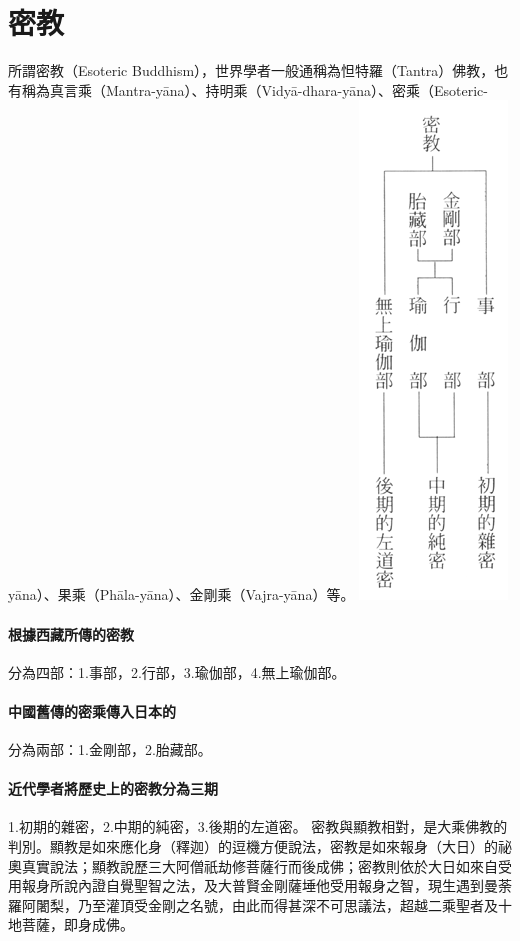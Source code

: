 \section{密教}
所謂密教（Esoteric Buddhism），世界學者一般通稱為怛特羅（Tantra）佛教，也有稱為真言乘（Mantra-yāna）、持明乘（Vidyā-dhara-yāna）、密乘（Esoteric-yāna）、果乘（Phāla-yāna）、金剛乘（Vajra-yāna）等。
\includegraphics[scale=0.3]{释家/images/密教.png}
\paragraph{根據西藏所傳的密教} 分為四部：1.事部，2.行部，3.瑜伽部，4.無上瑜伽部。
\paragraph{中國舊傳的密乘傳入日本的} 分為兩部：1.金剛部，2.胎藏部。
\paragraph{近代學者將歷史上的密教分為三期} 1.初期的雜密，2.中期的純密，3.後期的左道密。
密教與顯教相對，是大乘佛教的判別。顯教是如來應化身（釋迦）的逗機方便說法，密教是如來報身（大日）的祕奧真實說法；顯教說歷三大阿僧祇劫修菩薩行而後成佛；密教則依於大日如來自受用報身所說內證自覺聖智之法，及大普賢金剛薩埵他受用報身之智，現生遇到曼荼羅阿闍梨，乃至灌頂受金剛之名號，由此而得甚深不可思議法，超越二乘聖者及十地菩薩，即身成佛。

